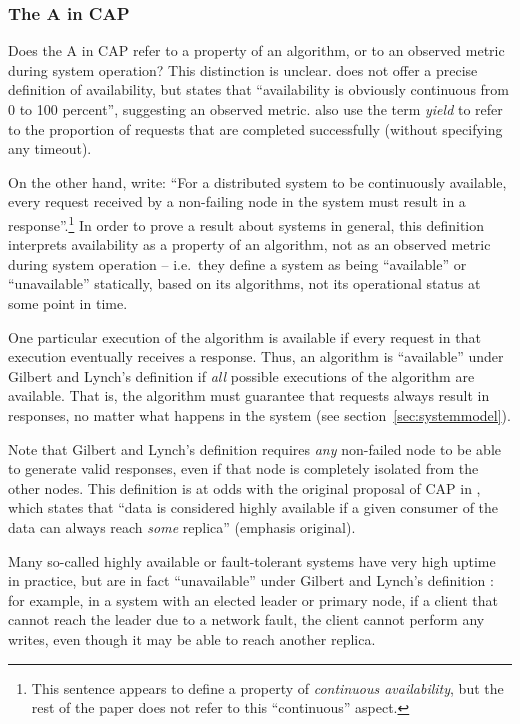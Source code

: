\documentclass[fleqn,12pt,lineno]{wlpeerj} %
\begin{document}
\subsubsection{The A in CAP}\label{sec:a-in-cap}

Does the A in CAP refer to a property of an algorithm, or to an observed metric during system
operation? This distinction is unclear. \citet{Brewer2012ba} does not offer a precise definition
of availability, but states that ``availability is obviously continuous from 0 to 100 percent'',
suggesting an observed metric. \citet{Fox1999bs} also use the term \emph{yield} to refer to the
proportion of requests that are completed successfully (without specifying any timeout).

On the other hand, \citet{Gilbert2002il} write: ``For a distributed system to be
continuously available, every request received by a non-failing node in the system must result in a
response''.\footnote{This sentence appears to define a property of \emph{continuous availability},
but the rest of the paper does not refer to this ``continuous'' aspect.} In order to prove a result
about systems in general, this definition interprets availability as a property of an algorithm, not
as an observed metric during system operation -- i.e.\ they define a system as being ``available''
or ``unavailable'' statically, based on its algorithms, not its operational status at some point in
time.

One particular execution of the algorithm is available if every request in that execution eventually
receives a response. Thus, an algorithm is ``available'' under Gilbert and Lynch's definition if
\emph{all} possible executions of the algorithm are available. That is, the algorithm must guarantee
that requests always result in responses, no matter what happens in the system (see
section~\ref{sec:systemmodel}).

Note that Gilbert and Lynch's definition requires \emph{any} non-failed node to be able to generate
valid responses, even if that node is completely isolated from the other nodes. This definition is
at odds with the original proposal of CAP in \citet{Fox1999bs}, which states that ``data is
considered highly available if a given consumer of the data can always reach \emph{some}
replica'' (emphasis original).

Many so-called highly available or fault-tolerant systems have very high uptime in practice, but are
in fact ``unavailable'' under Gilbert and Lynch's definition \citep{Kim1984bl}: for example, in a
system with an elected leader or primary node, if a client that cannot reach the leader due to a
network fault, the client cannot perform any writes, even though it may be able to reach another
replica.
\end{document}

